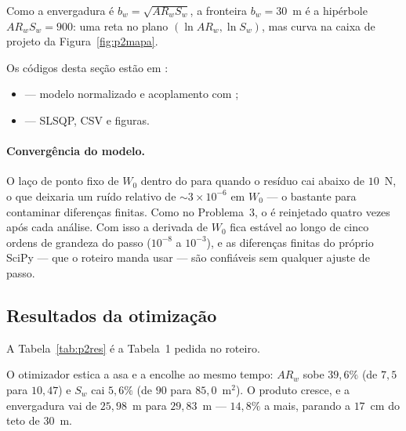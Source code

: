 Como a envergadura é $b_w = \sqrt{AR_w S_w}$, a fronteira $b_w = 30$~m
é a hipérbole $AR_w S_w = 900$: uma reta no plano
$(\ln AR_w, \ln S_w)$, mas curva na caixa de projeto da
Figura~\ref{fig:p2mapa}.

Os códigos desta seção estão em
:
\begin{itemize}
\item {} --- modelo normalizado e acoplamento com
      ;
\item {} --- SLSQP, CSV e figuras.
\end{itemize}

\paragraph{Convergência do modelo.}
O laço de ponto fixo de $W_0$ dentro do  para quando o
resíduo cai abaixo de $10$~N, o que deixaria um ruído relativo de
$\sim 3\times 10^{-6}$ em $W_0$ --- o bastante para contaminar diferenças
finitas. Como no Problema~3, o  é reinjetado quatro vezes
após cada análise. Com isso a derivada de $W_0$ fica estável ao longo de
cinco ordens de grandeza do passo ($10^{-8}$ a $10^{-3}$), e as
diferenças finitas do próprio SciPy --- que o roteiro manda usar --- são
confiáveis sem qualquer ajuste de passo.

\subsection{Resultados da otimização}
\label{sec:p2q1}

A Tabela~\ref{tab:p2res} é a Tabela~1 pedida no roteiro.

\begin{table}[H]
\centering
\caption{Resultados da otimização da aeronave padrão.}
\label{tab:p2res}
\small

\end{table}

O otimizador estica a asa e a encolhe ao mesmo tempo: $AR_w$ sobe
$39{,}6\%$ (de $7{,}5$ para $10{,}47$) e $S_w$ cai $5{,}6\%$ (de $90$ para
$85{,}0$~m$^2$). O produto cresce, e a envergadura vai de $25{,}98$~m para
$29{,}83$~m --- $14{,}8\%$ a mais, parando a $17$~cm do teto de $30$~m.

